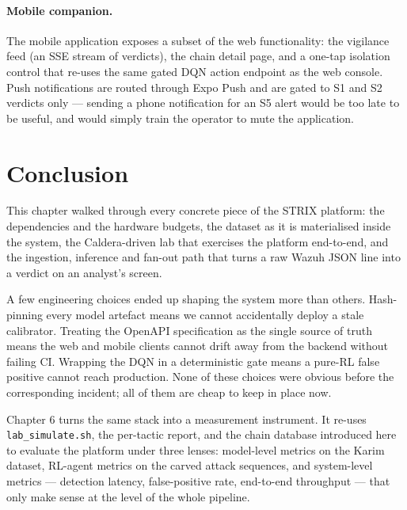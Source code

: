 \paragraph{Mobile companion.}
The mobile application exposes a subset of the web functionality: the
vigilance feed (an SSE stream of verdicts), the chain detail page,
and a one-tap isolation control that re-uses the same gated DQN
action endpoint as the web console. Push notifications are routed
through Expo Push and are gated to S1 and S2 verdicts only ---
sending a phone notification for an S5 alert would be too late to be
useful, and would simply train the operator to mute the application.

\section{Conclusion}

This chapter walked through every concrete piece of the STRIX
platform: the dependencies and the hardware budgets, the dataset as it
is materialised inside the system, the Caldera-driven lab that
exercises the platform end-to-end, and the ingestion, inference and
fan-out path that turns a raw Wazuh JSON line into a verdict on an
analyst's screen.

A few engineering choices ended up shaping the system more than others.
Hash-pinning every model artefact means we cannot accidentally deploy
a stale calibrator. Treating the OpenAPI specification as the single
source of truth means the web and mobile clients cannot drift away
from the backend without failing CI. Wrapping the DQN in a
deterministic gate means a pure-RL false positive cannot reach
production. None of these choices were obvious before the corresponding
incident; all of them are cheap to keep in place now.

Chapter 6 turns the same stack into a measurement instrument. It
re-uses \texttt{lab\_simulate.sh}, the per-tactic report, and the
chain database introduced here to evaluate the platform under three
lenses: model-level metrics on the Karim dataset, RL-agent metrics on
the carved attack sequences, and system-level metrics --- detection
latency, false-positive rate, end-to-end throughput --- that only make
sense at the level of the whole pipeline.
